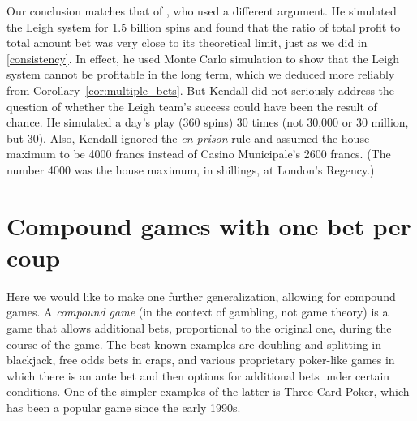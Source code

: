 \documentclass{article}
\theoremstyle{definition}
\theoremstyle{remark}
\begin{document}
Our conclusion matches that of \cite{K18}, who used a different argument.  He simulated the Leigh system for 1.5 billion spins and found that the ratio of total profit to total amount bet was very close to its theoretical limit, just as we did in \eqref{consistency}. In effect, he used Monte Carlo simulation to show that the Leigh system cannot be profitable in the long term, which we deduced more reliably from Corollary~\ref{cor:multiple_bets}.  But Kendall did not seriously address the question of whether the Leigh team's success could have been the result of chance.  He simulated a day's play (360 spins) 30 times (not 30,000 or 30 million, but 30).  Also, Kendall ignored the \textit{en prison} rule and assumed the house maximum to be 4000 francs instead of Casino Municipale's 2600 francs.  (The number 4000 was the house maximum, in shillings, at London's Regency.)





\section{Compound games with one bet per coup}\label{sec:compound-one}

Here we would like to make one further generalization, allowing for compound games.  A \textit{compound game} (in the context of gambling, not game theory) is a game that allows additional bets, proportional to the original one, during the course of the game.  The best-known examples are doubling and splitting in blackjack, free odds bets in craps, and various proprietary poker-like games in which there is an ante bet and then options for additional bets under certain conditions.  One of the simpler examples of the latter is Three Card Poker, which has been a popular game since the early 1990s.
\end{document}
